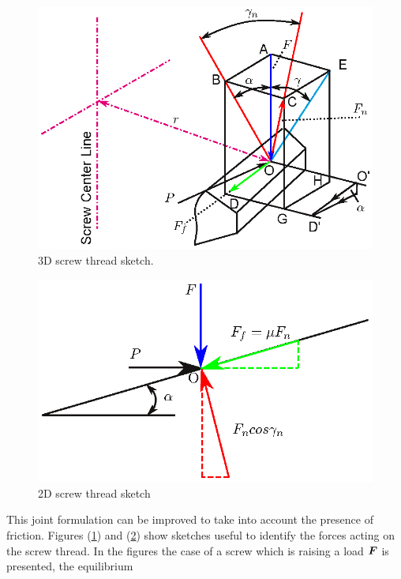 \begin{figure}[h]
  \begin{center}
    \includegraphics{Screw_sketch}
  \end{center}
  \caption{3D screw thread sketch.}
  \label{fig:screw_sketch_3D}
\end{figure}
\begin{figure}[h]
  \begin{center}
    \includegraphics{Screw_sketch_2D}
  \end{center}
  \caption{2D screw thread sketch}
  \label{fig:screw_sketch_2D}
\end{figure}
This joint formulation can be improved to take into account the presence of
friction. Figures (\ref{fig:screw_sketch_3D}) and (\ref{fig:screw_sketch_2D}) show sketches 
useful to identify the forces acting on the screw thread. In the figures
the case of a screw which is raising a load $\bm{F}$ is presented, the equilibrium 

